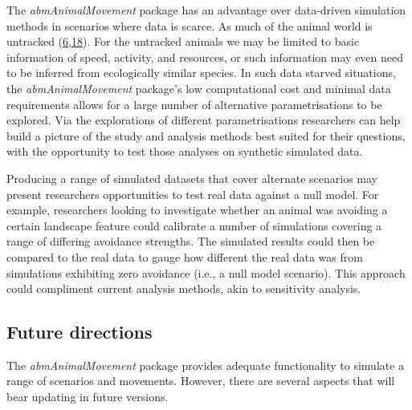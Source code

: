 \documentclass[10pt,a4paper]{article}
\begin{document}
The \emph{abmAnimalMovement} package has an advantage over data-driven simulation methods in scenarios where data is scarce.
As much of the animal world is untracked (\protect\hyperlink{ref-joo_recent_2022}{6},\protect\hyperlink{ref-crane_lots_2021}{18}).
For the untracked animals we may be limited to basic information of speed, activity, and resources, or such information may even need to be inferred from ecologically similar species.
In such data starved situations, the \emph{abmAnimalMovement} package's low computational cost and minimal data requirements allows for a large number of alternative parametrisations to be explored.
Via the explorations of different parametrisations researchers can help build a picture of the study and analysis methods best suited for their questions, with the opportunity to test those analyses on synthetic simulated data.

Producing a range of simulated datasets that cover alternate scenarios may present researchers opportunities to test real data against a null model.
For example, researchers looking to investigate whether an animal was avoiding a certain landscape feature could calibrate a number of simulations covering a range of differing avoidance strengths.
The simulated results could then be compared to the real data to gauge how different the real data was from simulations exhibiting zero avoidance (i.e., a null model scenario).
This approach could compliment current analysis methods, akin to sensitivity analysis.

\hypertarget{future-directions}{%
\subsection{Future directions}\label{future-directions}}

The \emph{abmAnimalMovement} package provides adequate functionality to simulate a range of scenarios and movements.
However, there are several aspects that will bear updating in future versions.
\end{document}
